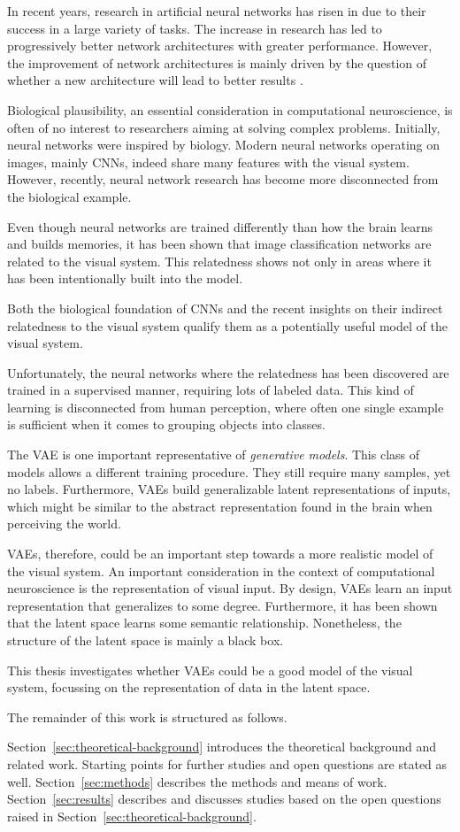 In recent years, research in artificial neural networks has risen in due to their success in a large variety of tasks.
The increase in research has led to progressively better network architectures with greater performance.
However, the improvement of network architectures is mainly driven by the question of whether a new architecture will lead to better results \citep{lindsay2020convolutional}.

Biological plausibility, an essential consideration in computational neuroscience, is often of no interest to researchers aiming at solving complex problems.
Initially, neural networks were inspired by biology.
Modern neural networks operating on images, mainly \acp{CNN}, indeed share many features with the visual system.
However, recently, neural network research has become more disconnected from the biological example.

Even though neural networks are trained differently than how the brain learns and builds memories, it has been shown that image classification networks are related to the visual system.
This relatedness shows not only in areas where it has been intentionally built into the model.

Both the biological foundation of \acp{CNN} and the recent insights on their indirect relatedness to the visual system qualify them as a potentially useful model of the visual system.

Unfortunately, the neural networks where the relatedness has been discovered are trained in a supervised manner, requiring lots of labeled data.
This kind of learning is disconnected from human perception, where often one single example is sufficient when it comes to grouping objects into classes.

The \ac{VAE} is one important representative of \textit{generative models}.
This class of models allows a different training procedure.
They still require many samples, yet no labels.
Furthermore, \acp{VAE} build generalizable latent representations of inputs, which might be similar to the abstract representation found in the brain when perceiving the world.

\acp{VAE}, therefore, could be an important step towards a more realistic model of the visual system.
An important consideration in the context of computational neuroscience is the representation of visual input.
By design, \acp{VAE} learn an input representation that generalizes to some degree.
Furthermore, it has been shown that the latent space learns some semantic relationship.
Nonetheless, the structure of the latent space is mainly a black box.

This thesis investigates whether \acp{VAE} could be a good model of the visual system, focussing on the representation of data in the latent space.

The remainder of this work is structured as follows.

Section~\ref{sec:theoretical-background} introduces the theoretical background and related work.
Starting points for further studies and open questions are stated as well.
Section~\ref{sec:methods} describes the methods and means of work.
Section~\ref{sec:results} describes and discusses studies based on the open questions raised in Section~\ref{sec:theoretical-background}.
